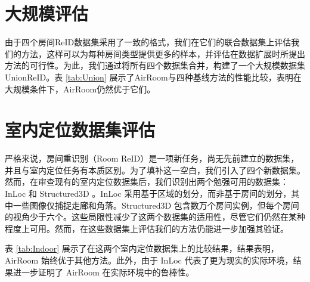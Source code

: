 \section{大规模评估}
由于四个房间ReID数据集采用了一致的格式，我们在它们的联合数据集上评估我们的方法，这样可以为每种房间类型提供更多的样本，并评估在数据扩展时所提出方法的可行性。为此，我们通过将所有四个数据集合并，构建了一个大规模数据集UnionReID。表 \ref{tab:Union} 展示了AirRoom与四种基线方法的性能比较，表明在大规模条件下，AirRoom仍然优于它们。

\begin{table}[h]
\centering
{}
\caption{在 UnionReID 上与基线模型的对比，用于评估 AirRoom 在数据扩展下的性能。}
\label{tab:Union}
\end{table}
\section{室内定位数据集评估}
严格来说，房间重识别（Room ReID）是一项新任务，尚无先前建立的数据集，并且与室内定位任务有本质区别。为了填补这一空白，我们引入了四个新数据集。然而，在审查现有的室内定位数据集后，我们识别出两个勉强可用的数据集：InLoc \cite{taira2018inlocindoorvisuallocalization} 和 Structured3D \cite{Structured3D}。InLoc \cite{taira2018inlocindoorvisuallocalization} 采用基于区域的划分，而非基于房间的划分，其中一些图像仅捕捉走廊和角落。Structured3D \cite{Structured3D} 包含数万个房间实例，但每个房间的视角少于六个。这些局限性减少了这两个数据集的适用性，尽管它们仍然在某种程度上可用。然而，在这些数据集上评估我们的方法仍能进一步加强其验证。

表 \ref{tab:Indoor} 展示了在这两个室内定位数据集上的比较结果，结果表明，AirRoom 始终优于其他方法。此外，由于 InLoc 代表了更为现实的实际环境，结果进一步证明了 AirRoom 在实际环境中的鲁棒性。

